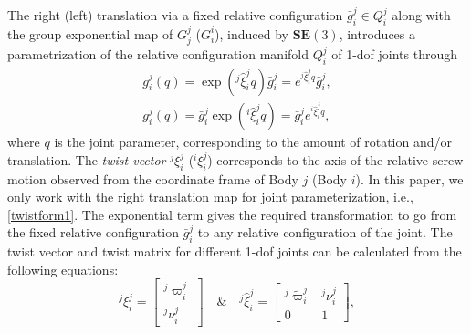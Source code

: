 \documentclass[lettersize,journal]{IEEEtran}
\def \SE {\textbf{SE}(3)}
\def \R  {\mathbb{R}}
\begin{document}
The right (left) translation via a fixed relative configuration $\bar{g}^j_i\in Q_i^j$ along with the group exponential map of $G^j_j$ ($G_i^i$), induced by $\SE$, introduces a parametrization of the relative configuration manifold $Q_i^j$ of 1-dof joints through  
\begin{align}
       g^j_i(q)=\exp(^j\hat{\xi}^j_iq)\bar{g}^j_i=e^{^j\hat{\xi}^j_iq}\bar{g}^j_i,\label{twistform1}\\ g^j_i(q)=\bar{g}^j_i{}\exp(^i\hat{\xi}^j_iq)=\bar{g}^j_i{} e^{^i\hat{\xi}^j_iq} ,
\end{align}
where $q$ is the joint parameter, corresponding to the amount of rotation and/or translation. The \textit{twist vector} $^j\xi_i^j$ ($^i\xi_i^j$) corresponds to the axis of the relative screw motion observed from the coordinate frame of Body $j$ (Body $i$). In this paper, we only work with the right translation map for joint parameterization, i.e., \eqref{twistform1}. The exponential term gives the required transformation to go from the fixed relative configuration $\bar{g}^j_i$ to any relative configuration of the joint. %
The twist vector and twist matrix for different 1-dof joints can be calculated from the following equations: 
\begin{equation}
    ^j\xi^j_i=\begin{bmatrix}^j\varpi_i^j \\^j\nu^j_i\end{bmatrix} \quad \& \quad ^j\hat{\xi}^j_i=\begin{bmatrix}^j\tilde{\varpi}_i^j  & ^j\nu^j_i \\0 & 1\end{bmatrix}, \label{twist1}
\end{equation}
\end{document}
